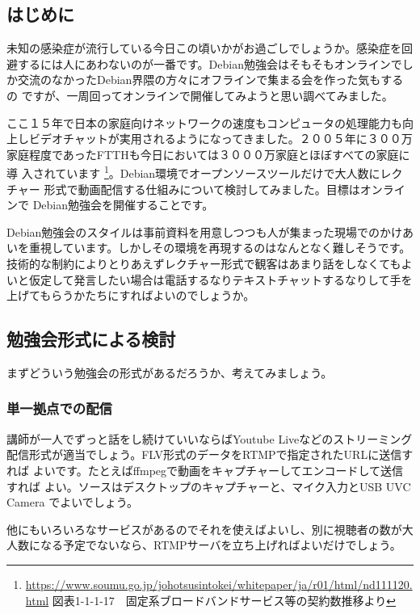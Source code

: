 \documentclass[mingoth,a4paper]{jsarticle}
\begin{document}
\subsection{はじめに}

未知の感染症が流行している今日この頃いかがお過ごしでしょうか。感染症を回
避するには人にあわないのが一番です。Debian勉強会はそもそもオンラインでし
か交流のなかったDebian界隈の方々にオフラインで集まる会を作った気もするの
ですが、一周回ってオンラインで開催してみようと思い調べてみました。

ここ１５年で日本の家庭向けネットワークの速度もコンピュータの処理能力も向
上しビデオチャットが実用されるようになってきました。２００５年に３００万
家庭程度であったFTTHも今日においては３０００万家庭とほぼすべての家庭に導
入されています
\footnote{\url{https://www.soumu.go.jp/johotsusintokei/whitepaper/ja/r01/html/nd111120.html}
 図表1-1-1-17　固定系ブロードバンドサービス等の契約数推移より}。Debian環境でオープンソースツールだけで大人数にレクチャー
形式で動画配信する仕組みについて検討してみました。目標はオンラインで
Debian勉強会を開催することです。

Debian勉強会のスタイルは事前資料を用意しつつも人が集まった現場でのかけあ
いを重視しています。しかしその環境を再現するのはなんとなく難しそうです。
技術的な制約によりとりあえずレクチャー形式で観客はあまり話をしなくてもよ
いと仮定して発言したい場合は電話するなりテキストチャットするなりして手を
上げてもらうかたちにすればよいのでしょうか。

\subsection{勉強会形式による検討}

まずどういう勉強会の形式があるだろうか、考えてみましょう。


\subsubsection{単一拠点での配信}

講師が一人でずっと話をし続けていいならばYoutube Liveなどのストリーミング
配信形式が適当でしょう。FLV形式のデータをRTMPで指定されたURLに送信すれば
よいです。たとえばffmpegで動画をキャプチャーしてエンコードして送信すれば
よい。ソースはデスクトップのキャプチャーと、マイク入力とUSB UVC Camera
でよいでしょう。

他にもいろいろなサービスがあるのでそれを使えばよいし、別に視聴者の数が大
人数になる予定でないなら、RTMPサーバを立ち上げればよいだけでしょう。
\end{document}

